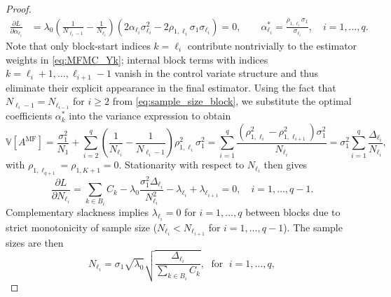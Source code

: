 \begin{proof}
%
\begin{align}
\label{eq:partial_L_alpha_k}
    \frac{\partial L}{\partial \alpha_{\ell_i}}&=\lambda_0\left(\frac{1}{N_{\ell_i-1}} - \frac{1}{N_{\ell_i}}\right)\left(2\alpha_{\ell_i}\sigma_{\ell_i}^2 - 2\rho_{1,\ell_i}\sigma_1\sigma_{\ell_i}\right)=0,\quad\quad  \alpha_{\ell_i}^* = \frac{\rho_{1,\ell_i}\sigma_1}{\sigma_{\ell_i}}, \quad i=1,\dots,q.
\end{align}
%
Note that only block-start indices $k=\ell_i$ contribute nontrivially to the estimator weights in \eqref{eq:MFMC_Yk}; internal block terms with indices $k = \ell_i+1,\ldots, \ell_{i+1}-1$ vanish in the control variate structure and thus eliminate their explicit appearance in the final estimator. Using the fact that $N_{\ell_{i}-1} = N_{\ell_{i-1}}$ for $i\ge 2$ from \eqref{eq:sample_size_block}, we substitute the optimal coefficients $\alpha_k^*$ into the variance expression to obtain
%
\begin{equation}\label{eq:MFMC_var_convex}
    \mathbb{V}\left[A^{\text{MF}}\right] = \frac{\sigma_1^2}{N_1}+\sum_{i=2}^q
\left(\frac{1}{N_{\ell_{i}}}-\frac{1}{N_{\ell_{i}-1}}\right)\rho_{1,\ell_i}^2\sigma_1^2=\sum_{i=1}^{q} \frac{ \left(\rho_{1,\ell_i}^2-\rho_{1,\ell_{i+1}}^2\right)\sigma_1^2}{N_{\ell_i}}=\sigma_1^2\sum_{i=1}^{q} \frac{\Delta_{\ell_i}}{N_{\ell_i}},
\end{equation}
%
with $\rho_{1,\ell_{q+1}} = \rho_{1,K+1} = 0$. Stationarity with respect to \(N_{\ell_i}\) then gives
%
\[
\frac{\partial L}{\partial N_{\ell_i}} =\sum_{k\in B_i}C_{k} -  \lambda_0\frac{\sigma_1^2\Delta_{\ell_i}}{N_{\ell_i}^2}-\lambda_{\ell_{i}}+\lambda_{\ell_{i+1}}=0,\quad i = 1, \ldots,q-1.
\]
%
Complementary slackness implies $\lambda_{\ell_i} = 0$ for $i=1,\ldots, q$ between blocks due to strict monotonicity of sample size ($N_{\ell_{i}} < N_{\ell_{i+1}}$ for $i = 1, \ldots, q-1$). The sample sizes are then
%
\begin{equation}\label{eq:sample_size_1}
    N_{\ell_i} = \sigma_1\sqrt{\lambda_0} \sqrt{\frac{\Delta_{\ell_i}}{\sum_{k\in B_i} C_{k}}}, \;\text{ for }\; i=1,\ldots,q,

\end{equation}
\end{proof}
